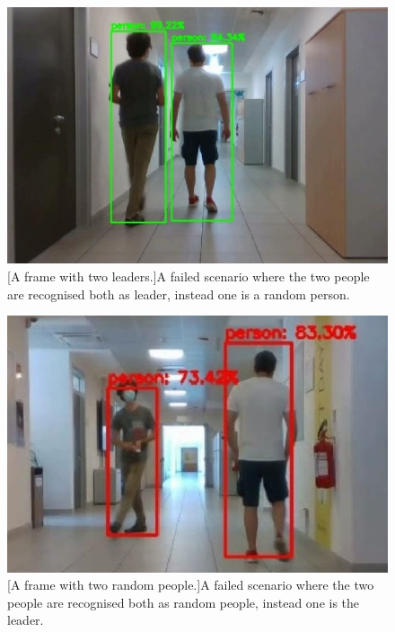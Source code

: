 \begin{figure}
	\centering
	\begin{minipage}{.49\textwidth}
		\centering
		\includegraphics[width=1\linewidth]{images/solution/leaderSubjectDoubleMatch}
		\captionsetup{margin=0.2cm}
		[A frame with two leaders.]{A failed scenario where the two people are recognised both as leader, instead one is a random person.}
		\label{fig:leaderSubjectDoubleMatch}
	\end{minipage}
	\begin{minipage}{.49\textwidth}
		\centering
		\includegraphics[width=1\linewidth]{images/solution/leaderSubjectDoubleFail}
		\captionsetup{margin=0.2cm}
		[A frame with two random people.]{A failed scenario where the two people are recognised both as random people, instead one is the leader.}
		\label{fig:leaderSubjectDoubleFail}
	\end{minipage}
\end{figure}

